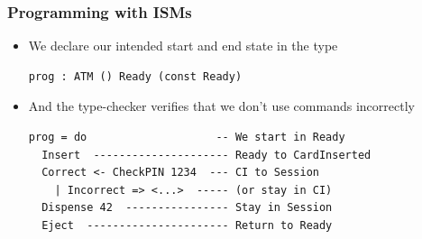 \documentclass[compress,handout]{beamer}
\begin{document}
\begin{frame}[fragile]
  \frametitle{Programming with ISMs}

  \begin{itemize}
    \item<1-> We declare our intended start and end state in the type
              \begin{verbatim}
prog : ATM () Ready (const Ready)
              \end{verbatim}
    \item<2-> And the type-checker verifies that we don't use commands
              incorrectly
              \begin{verbatim}
prog = do                    -- We start in Ready
  Insert  --------------------- Ready to CardInserted
  Correct <- CheckPIN 1234  --- CI to Session
    | Incorrect => <...>  ----- (or stay in CI)
  Dispense 42  ---------------- Stay in Session
  Eject  ---------------------- Return to Ready
              \end{verbatim}
  \end{itemize}

\end{frame}


\end{document}
